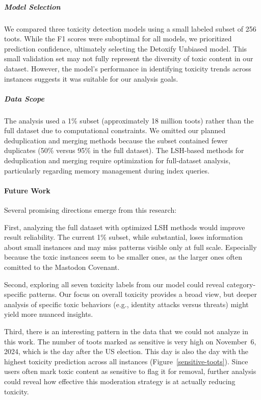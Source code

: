 \subparagraph{Model Selection}
We compared three toxicity detection models using a small labeled subset of 256 toots. While the F1 scores were suboptimal for all models, we prioritized prediction confidence, ultimately selecting the Detoxify Unbiased model. This small validation set may not fully represent the diversity of toxic content in our dataset. However, the model's performance in identifying toxicity trends across instances suggests it was suitable for our analysis goals.

\subparagraph{Data Scope}
The analysis used a 1\% subset (approximately 18 million toots) rather than the full dataset due to computational constraints. We omitted our planned deduplication and merging methods because the subset contained fewer duplicates (50\% versus 95\% in the full dataset). The LSH-based methods for deduplication and merging require optimization for full-dataset analysis, particularly regarding memory management during index queries.

\paragraph{Future Work}
Several promising directions emerge from this research:

First, analyzing the full dataset with optimized LSH methods would improve result reliability. The current 1\% subset, while substantial, loses information about small instances and may miss patterns visible only at full scale. Especially because the toxic instances seem to be smaller ones, as the larger ones often comitted to the Mastodon Covenant.

Second, exploring all seven toxicity labels from our model could reveal category-specific patterns. Our focus on overall toxicity provides a broad view, but deeper analysis of specific toxic behaviors (e.g., identity attacks versus threats) might yield more nuanced insights.

Third, there is an interesting pattern in the data that we could not analyze in this work. The number of toots marked as sensitive is very high on November~6, 2024, which is the day after the US election. This day is also the day with the highest toxicity prediction across all instances (Figure~\ref{sensitive-toots}). Since users often mark toxic content as sensitive to flag it for removal, further analysis could reveal how effective this moderation strategy is at actually reducing toxicity. 